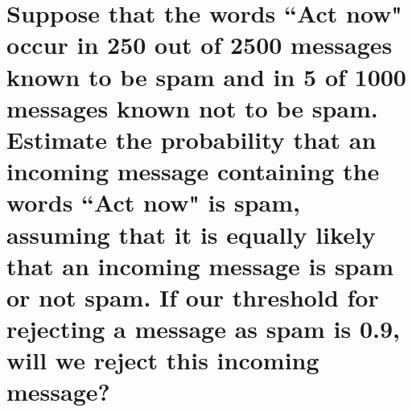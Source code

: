 \documentclass{article}
\begin{document}

\section{Suppose that the words ``Act now" occur in 250 out of 2500 messages known to be spam
    and in 5 of 1000 messages known not to be spam. Estimate the probability that an
    incoming message containing the words ``Act now" is spam, assuming that it is equally
    likely that an incoming message is spam or not spam. If our threshold for rejecting
    a message as spam is 0.9, will we reject this incoming message?}
\end{document}

